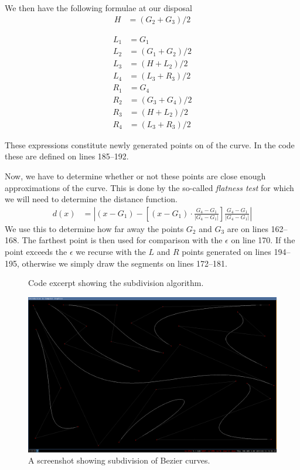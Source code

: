\documentclass[11pt]{article}
\newcommand{\codefig}[5]
{
\begin{figure}[H]
    
    \caption{#5}
    \label{code:#1}
\end{figure}
}
\begin{document}
We then have the following formulae at our disposal
\begin{align}
    H &= (G_2 + G_3) / 2
\end{align}
\vspace{-0.75in}
\begin{multicols*}{2}
    \begin{align}
        L_1 &= G_1 \\
        L_2 &= (G_1 + G_2) / 2 \\
        L_3 &= (H + L_2) / 2 \\
        L_4 &= (L_3 + R_3) / 2
    \end{align}
    \vfill\columnbreak
    \begin{align}
        R_1 &= G_4 \\
        R_2 &= (G_3 + G_4) / 2 \\
        R_3 &= (H + L_2) / 2 \\
        R_4 &= (L_3 + R_3) / 2
    \end{align}
\end{multicols*}
These expressions constitute newly generated points on of the curve. In the
code these are defined on lines 185--192.

Now, we have to determine whether or not these points are close enough
approximations of the curve. This is done by the so-called {\it flatness test}
for which we will need to determine the distance function.
\begin{align}
    d(x) &=
    \left|(x - G_1) - \left[(x - G_1) \cdot \frac{G_4 - G_1}{\lvert G_4 - G_1 \rvert}\right] \frac{G_4 - G_1}{\lvert G_4 - G_1 \rvert} \right|
\end{align}
We use this to determine how far away the points $G_2$ and $G_3$ are on lines
162--168. The farthest point is then used for comparison with the $\epsilon$
on line 170. If the point exceeds the $\epsilon$ we recurse with the $L$ and
$R$ points generated on lines 194--195, otherwise we simply draw the segments
on lines 172--181.

\codefig{sampled}{BezierVec4.cpp}{162}{196}
{Code excerpt showing the subdivision algorithm.}

\begin{figure}[H]
    \center
    \includegraphics[scale=0.25]{figures/test-subdivision.png}
    \caption{A screenshot showing subdivision of Bezier curves.}
    \label{fig:test-subdivision}
\end{figure}
\end{document}
